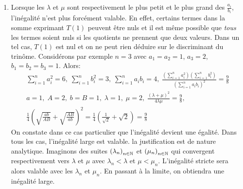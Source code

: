 \begin{enumerate}
\begin{enumerate}
  \item Lors des questions précédentes, les $a$, $b$, $A$, $B$ ne sont pas intervenus. Seuls les $\lambda$ et $\mu$ avec leur propriété fondamentale 
\begin{displaymath}
\forall i\in \{1,\cdots,n\}; \hspace{0.5cm} \lambda < \frac{a_i}{b_i} < \mu  
\end{displaymath}
  ont figurés dans le raisonnement. En fait, on peut \emph{fabriquer} de tels $\lambda$ et $\mu$ à partir des $a, A, b, B$. \`A cause des propriétés élémentaires des inégalités (tous les nombres étant strictement positifs):
\begin{displaymath}
\forall i\in \{1,\cdots,n\}; \hspace{0.5cm} \frac{a}{B} < \frac{a_i}{b_i} < \frac{A}{b}  
\end{displaymath}
Avec $\lambda = \frac{a}{B}$ et $\mu = \frac{A}{b}$,
\begin{displaymath}
\frac{(\lambda + \mu)^2}{4\lambda \mu} =\frac{1}{4}\left(\frac{\lambda + \mu}{\sqrt{\lambda \mu}} \right)^2
=\frac{1}{4}\left(\sqrt{\frac{\lambda}{\mu}} +\sqrt{\frac{\mu}{\lambda}}\right)^2  
=\frac{1}{4}\left(\sqrt{\frac{ab}{AB}} +\sqrt{\frac{AB}{ab}}\right)^2
\end{displaymath}
\end{enumerate}
\item Lorsque les $\lambda$ et $\mu$ sont respectivement le plus petit et le plus grand des $\frac{a_i}{b_i}$, l'inégalité n'est plus forcément valable. En effet, certains termes dans la somme exprimant $T(1)$ peuvent être nuls et il est même possible que \emph{tous} les termes soient nuls si les quotients ne prennent que deux valeurs.\newline
Dans un tel cas, $T(1)$ est nul et on ne peut rien déduire sur le discriminant du trinôme.\newline
Considérons par exemple $n=3$ avec $a_1=a_2=1$, $a_3=2$, $b_1=b_2=b_3=1$. Alors:
\begin{multline*}
\sum_{i=1}^{n}a_i^2 = 6,\; \sum_{i=1}^{n}b_i^2 = 3,\; \sum_{i=1}^{n}a_ib_i = 4,\;
\frac{\left( \sum_{i=1}^{n}a_i^2\right)\left( \sum_{i=1}^{n}b_i^2\right)}{\left( \sum_{i=1}^{n}a_ib_i\right)^2} = \frac{9}{8} \\
a=1,\; A=2,\; b=B=1,\; \lambda =1,\; \mu = 2,\; \frac{(\lambda + \mu)^2}{4\lambda \mu} = \frac{9}{8},\\
\frac{1}{4}\left(\sqrt{\frac{ab}{AB}} +\sqrt{\frac{AB}{ab}}\right)^2=\frac{1}{4}(\frac{1}{\sqrt{2}}+\sqrt{2}) = \frac{9}{8}
\end{multline*}
On constate dans ce cas particulier que l'inégalité devient une égalité. Dans tous les cas, l'inégalité large est valable. la justification est de nature analytique. Imaginons des suites $\left( \lambda_n\right)_{n\in \mathbb{N}}$ et $\left( \mu_n\right)_{n\in \mathbb{N}}$ qui convergent respectivement vers $\lambda$ et $\mu$ avec $\lambda_n < \lambda$ et $\mu< \mu_n$. L'inégalité stricte sera alors valable avec les $\lambda_n$ et $\mu_n$. En passant à la limite, on obtiendra une inégalité large. 
\end{enumerate}
